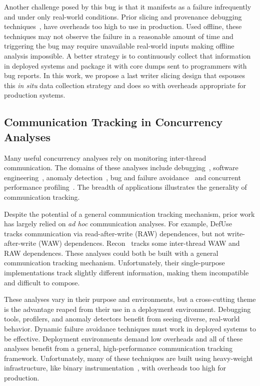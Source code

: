 \documentclass[preprint,10pt]{sigplanconf}
\begin{document}
Another challenge posed by this bug is that it manifests as a failure
infrequently and under only real-world conditions.  Prior slicing and
provenance debugging
techniques~\cite{tipslicingsurvey,thinslicing,whylineicse}, have overheads too
high to use in production.  Used offline, these techniques may not observe the
failure in a reasonable amount of time and triggering the bug may require
unavailable real-world inputs making offline analysis impossible.   A better
strategy is to continuously collect that information in deployed systems and
package it with core dumps sent to programmers with bug reports.  In this work,
we propose a last writer slicing design that espouses this {\em in situ} data
collection strategy and does so with overheads appropriate for production
systems.


\subsection{Communication Tracking in Concurrency Analyses}
\label{sec:background:comm}

Many useful concurrency analyses rely on monitoring inter-thread
communication.  The domains of these analyses include 
debugging~\cite{defuse,conseq,recon,bugaboo,raceslicing,fasttrack,falcon},
software engineering~\cite{oshajava,oshatr}, anomaly
detection~\cite{avio,dmtracker,cci,daikon}, bug and failure
avoidance~\cite{aviso,cfix} and concurrent performance
profiling~\cite{threadcriticality,schedpredictionmodel}.  The breadth of
applications illustrates the generality of communication tracking.

Despite the potential of a general communication tracking mechanism, prior work
has largely relied on {\em ad hoc} communication analyses.  For example,
DefUse~\cite{defuse} tracks communication via read-after-write (RAW)
dependences, but not write-after-write (WAW) dependences.  Recon~\cite{recon}
tracks some inter-thread WAW and RAW dependences.  These analyses could both be
built with a general communication tracking mechanism.  Unfortunately, their
single-purpose implementations track slightly different information, making
them incompatible and difficult to compose.

These analyses vary in their purpose and environments, but a cross-cutting
theme is the advantage reaped from their use in a deployment environment.
Debugging tools, profilers, and anomaly detectors benefit from seeing diverse,
real-world behavior.  Dynamic failure avoidance techniques must work in
deployed systems to be effective.  Deployment environments demand low overheads
and all of these analyses benefit from a general, high-performance
communication tracking framework.  Unfortunately, many of these techniques are built using heavy-weight infrastructure, like binary instrumentation~\cite{pin}, with overheads too high for production.  
\end{document}
